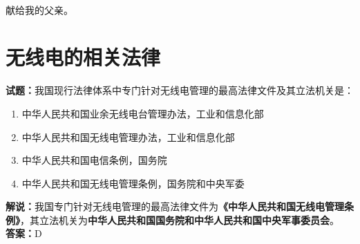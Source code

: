 \documentclass{ctexbook}
\newcommand{\commit}{\dots~(in \emph{packed-refs})}}
\begin{document}

\title{}
\author{\large \texttt{BG7XTQ}（原\texttt{JJ1DSB}）编著}
\date{\large{日期：\texttt{\today}}
  \\版本：\texttt{\commit}在\texttt{\branch}分支上
  \\使用  编译
}

\maketitle

\thispagestyle{empty}
\vfil
\ \\
\vspace{15em}
\begin{center}
  {\Large 献给我的父亲。}
\end{center}

\newpage

\tableofcontents%






\chapter{无线电的相关法律}

\newpage

\noindent\textbf{试题：}我国现行法律体系中专门针对无线电管理的最高法律文件及其立法机关是：

\begin{enumerate}[leftmargin=3em]
  \item 中华人民共和国业余无线电台管理办法，工业和信息化部
  \item 中华人民共和国无线电管理办法，工业和信息化部
  \item 中华人民共和国电信条例，国务院
  \item 中华人民共和国无线电管理条例，国务院和中央军委
\end{enumerate}

\noindent\textbf{解说：}我国专门针对无线电管理的最高法律文件为\textbf{《中华人民共和国无线电管理条例》}，其立法机关为\textbf{中华人民共和国国务院和中华人民共和国中央军事委员会}。\\\noindent\textbf{答案：}D

\vspace{\baselineskip}
\end{document}
